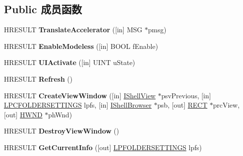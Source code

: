 \subsection*{Public 成员函数}
\begin{DoxyCompactItemize}
\item 
\mbox{\label{interface_i_shell_view_acd649057a19151f2e395cb52b97601cc}} 
H\+R\+E\+S\+U\+LT {\bfseries Translate\+Accelerator} (\mbox{[}in\mbox{]} M\+SG $\ast$pmsg)
\item 
\mbox{\label{interface_i_shell_view_a560e764da24afda6ed542c01659bb565}} 
H\+R\+E\+S\+U\+LT {\bfseries Enable\+Modeless} (\mbox{[}in\mbox{]} B\+O\+OL f\+Enable)
\item 
\mbox{\label{interface_i_shell_view_a62fa375c9e06139ed3c94433565f6590}} 
H\+R\+E\+S\+U\+LT {\bfseries U\+I\+Activate} (\mbox{[}in\mbox{]} U\+I\+NT u\+State)
\item 
\mbox{\label{interface_i_shell_view_aa183a63b8112953dd4319534b00e725a}} 
H\+R\+E\+S\+U\+LT {\bfseries Refresh} ()
\item 
\mbox{\label{interface_i_shell_view_a5c76159f3fb92453bd08c7f53d505464}} 
H\+R\+E\+S\+U\+LT {\bfseries Create\+View\+Window} (\mbox{[}in\mbox{]} \hyperlink{interface_i_shell_view}{I\+Shell\+View} $\ast$psv\+Previous, \mbox{[}in\mbox{]} \hyperlink{struct_f_o_l_d_e_r_s_e_t_t_i_n_g_s}{L\+P\+C\+F\+O\+L\+D\+E\+R\+S\+E\+T\+T\+I\+N\+GS} lpfs, \mbox{[}in\mbox{]} \hyperlink{interface_i_shell_browser}{I\+Shell\+Browser} $\ast$psb, \mbox{[}out\mbox{]} \hyperlink{structtag_r_e_c_t}{R\+E\+CT} $\ast$prc\+View, \mbox{[}out\mbox{]} \hyperlink{interfacevoid}{H\+W\+ND} $\ast$ph\+Wnd)
\item 
\mbox{\label{interface_i_shell_view_a76d3c3df1a37d58ed36423155f75a000}} 
H\+R\+E\+S\+U\+LT {\bfseries Destroy\+View\+Window} ()
\item 
\mbox{\label{interface_i_shell_view_ab57894931c1a629a7e9aef2645bbad0d}} 
H\+R\+E\+S\+U\+LT {\bfseries Get\+Current\+Info} (\mbox{[}out\mbox{]} \hyperlink{struct_f_o_l_d_e_r_s_e_t_t_i_n_g_s}{L\+P\+F\+O\+L\+D\+E\+R\+S\+E\+T\+T\+I\+N\+GS} lpfs)

\end{DoxyCompactItemize}
